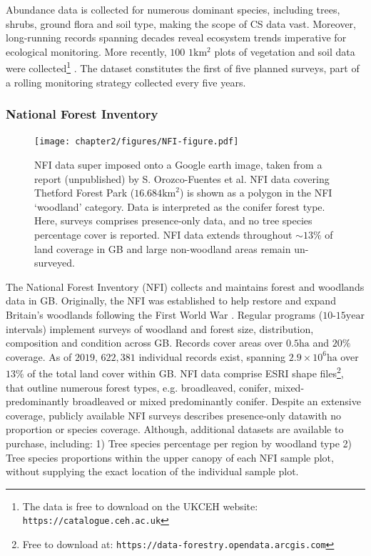 Abundance data is collected for numerous dominant species, including trees, shrubs, ground flora and soil type, 
making the scope of CS data vast. Moreover, long-running records spanning decades reveal ecosystem trends imperative for ecological monitoring.
More recently, $100$ $1\mathrm{km^2}$ plots of vegetation and soil data were collected\footnote{
The data is free to download on the UKCEH website: \nolinkurl{https://catalogue.ceh.ac.uk}} \cite{10.5285/fd6ae272-aeb5-4573-8e8a-7ccfae64f506}.
The dataset constitutes the first of five planned surveys, part of a rolling monitoring strategy collected every five years.

\subsubsection{National Forest Inventory}

\begin{figure}
    \centering
    \texttt{[image: chapter2/figures/NFI-figure.pdf]}
    \caption{NFI data super imposed onto a Google earth image, taken from a report (unpublished) by S. Orozco-Fuentes et al.
             NFI data covering Thetford Forest Park ($16.684 \mathrm{km}^2$) is shown as a polygon in the NFI `woodland' category.
             Data is interpreted as the conifer forest type. Here, surveys comprises presence-only data, and no tree species percentage cover
             is reported. NFI data extends throughout $\sim 13\%$ of land coverage in GB and large non-woodland areas remain un-surveyed.}
    \label{fig:NFI-data}
\end{figure}

The National Forest Inventory (NFI) collects and maintains forest and woodlands data in GB.
Originally, the NFI was established to help restore and expand Britain's woodlands following the First World War \cite{james1990history}.
Regular programs ($10$-$15\mathrm{year}$ intervals) implement surveys of woodland and forest size, distribution, composition and condition across GB.
Records cover areas over $0.5\mathrm{ha}$ and $20\%$ coverage.
As of $2019$, $622,381$ individual records exist, spanning $2.9 \times 10^6 \mathrm{ha}$ over $13\%$ of the total land cover within GB.
NFI data comprise ESRI shape files\footnote{
Free to download at: \nolinkurl{https://data-forestry.opendata.arcgis.com}},
that outline numerous forest types, e.g. broadleaved, conifer, mixed-predominantly broadleaved or mixed predominantly conifer.
Despite an extensive coverage, publicly available NFI surveys describes presence-only data\textemdash with no proportion or species coverage.
Although, additional datasets are available to purchase, including: 
1) Tree species percentage per region by woodland type
2) Tree species proportions within the upper canopy of each NFI sample plot, without supplying the exact location of the individual sample plot.


